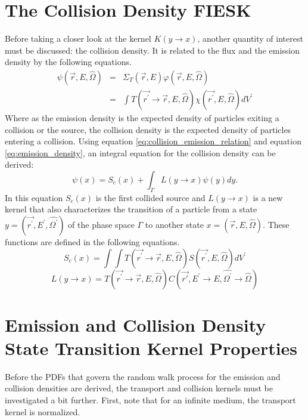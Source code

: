 \section{The Collision Density FIESK}
Before taking a closer look at the kernel $K(y \to x)$, another quantity of 
interest must be discussed: the collision density. It is related to the
flux and the emission density by the following equations.
\begin{eqnarray}
  \psi(\vec{r},E,\hat{\Omega}) & = & \Sigma_T(\vec{r},E)
  \varphi(\vec{r},E,\hat{\Omega}) \\
  & = & \int T(\vec{r^{'}} \to \vec{r},E,\hat{\Omega})
  \chi(\vec{r^{'}},E,\hat{\Omega})dV^{'}
  \label{eq:collision_emission_relation}
\end{eqnarray}
Where as the emission density is the expected density of particles exiting a 
collision or the source, the collision density is the expected density of 
particles entering a collision. Using equation 
\ref{eq:collision_emission_relation} and equation \ref{eq:emission_density}, an 
integral equation for the collision density can be derived:
\begin{equation*}
  \psi(x) = S_c(x) + \int_{\Gamma} L(y \to x)\psi(y)dy.
\end{equation*}
In this equation $S_c(x)$ is the first collided source and $L(y \to x)$ is
a new kernel that also characterizes the transition of a particle from a state 
$y = (\vec{r^{'}},E^{'},\hat{\Omega^{'}})$ of the phase space $\Gamma$ to another 
state $x = (\vec{r},E,\hat{\Omega})$. These functions are defined in the 
following equations.
\begin{equation}
  S_c(x) = \int\int T(\vec{r^{'}} \to \vec{r},E,\hat{\Omega})
  S(\vec{r^{'}},E,\hat{\Omega})dV^{'}
\end{equation}
\begin{equation}
  L(y \to x) =
  T(\vec{r^{'}} \to \vec{r},E,\hat{\Omega})
  C(\vec{r'},E^{'} \to E,\hat{\Omega^{'}} \to \hat{\Omega})
\end{equation}

\section{Emission and Collision Density State Transition Kernel Properties}
Before the PDFs that govern the random walk process for the emission and
collision densities are derived, the transport and collision kernels must be 
investigated a bit further. First, note that for an infinite medium, the 
transport kernel is normalized. 
  
